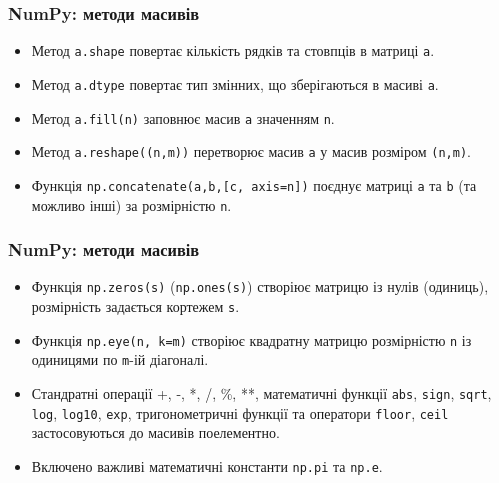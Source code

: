 \begin{frame}
\frametitle{NumPy: методи масивів}
\begin{itemize}
  \item Метод \texttt{a.shape} повертає кількість рядків та стовпців в матриці \texttt{a}.
  \item Метод \texttt{a.dtype} повертає тип змінних, що зберігаються в масиві \texttt{a}.
  \item Метод \texttt{a.fill(n)} заповнює масив \texttt{a} значенням \texttt{n}.
  \item Метод \texttt{a.reshape((n,m))} перетворює масив \texttt{a} у масив розміром \texttt{(n,m)}.
  \item Функція \texttt{np.concatenate(a,b,[c, axis=n])} поєднує матриці \texttt{a} та \texttt{b} (та можливо інші) за розмірністю \texttt{n}.
\end{itemize}

\end{frame}

\begin{frame}
\frametitle{NumPy: методи масивів}
\begin{itemize}
  \item Функція \texttt{np.zeros(s)} (\texttt{np.ones(s)}) створіює матрицю із нулів (одиниць), розмірність задається кортежем \texttt{s}.
  \item Функція \texttt{np.eye(n, k=m)} створіює квадратну матрицю розмірністю \texttt{n} із одиницями по   \texttt{m}-ій діагоналі.
  \item Стандратні операції +, -, *, /, \%, **, математичні функції \texttt{abs}, \texttt{sign}, \texttt{sqrt}, \texttt{log}, \texttt{log10}, \texttt{exp}, тригонометричні функції та оператори \texttt{floor},  \texttt{ceil}  застосовуються до масивів поелементно.
  \item Включено важливі математичні константи \texttt{np.pi} та \texttt{np.e}.

\end{itemize}

\end{frame}

